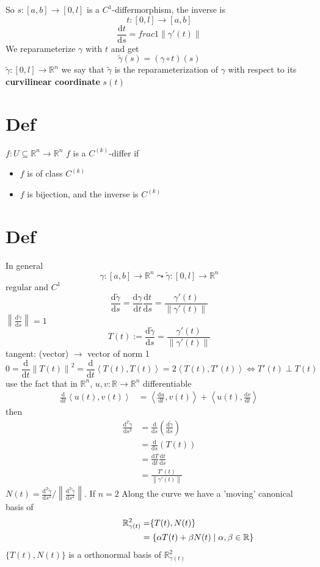 \documentclass{article}
\newcommand{\norm}[1]{\left\lVert #1 \right\rVert}
\begin{document}
So $s:[a,b]\rightarrow[0,l]$ is a $C^1$-differmorphism, the inverse is $$t:[0,l]\rightarrow[a,b]$$$$\frac{\text{d}t}{\text{d}s}=frac{1}{\norm{\gamma'(t)}}$$
We reparameterize $\gamma$ with $t$ and get
$$\tilde{\gamma}(s)=(\gamma\circ t)(s)$$
$\tilde{\gamma}:[0,l]\rightarrow\mathbb{R}^n$ we say that $\tilde{\gamma}$ is the reparameterization of $\gamma$ with respect to its \textbf{curvilinear coordinate} $s(t)$
\section{Def}
$f:U\subseteq\mathbb{R}^n\rightarrow\mathbb{R}^n$ $f$ is a $C^{(k)}$-differ if \begin{itemize}
    \item $f$ is of class $C^{(k)}$
    \item $f$ is bijection, and the inverse is $C^{(k)}$
\end{itemize}
\section{Def}
In general $$\gamma:[a,b]\rightarrow\mathbb{R}^n\leadsto \tilde{\gamma}:[0,l]\rightarrow\mathbb{R}^n$$
regular and $C^1$
$$\frac{\text{d}\tilde{\gamma}}{\text{d}s}=\frac{\text{d}\gamma}{\text{d}t}\frac{\text{d}t}{\text{d}s}=\frac{\gamma'(t)}{\norm{\gamma'(t)}}$$
$\norm{\frac{\text{d}\tilde{\gamma}}{\text{d}s}}=1$
$$T(t):=\frac{\text{d}\tilde{\gamma}}{\text{d}s}=\frac{\gamma'(t)}{\norm{\gamma'(t)}}$$
tangent: (vector) $\rightarrow$ vector of norm 1
$$0=\frac{\text{d}}{\text{d}t}\norm{T(t)}^2=\frac{\text{d}}{\text{d}t}\left<T(t),T(t)\right>=2\left<T(t),T'(t)\right>\Leftrightarrow T'(t)\perp T(t)$$
use the fact that in $\mathbb{R}^n$, $u,v:\mathbb{R}\rightarrow\mathbb{R}^n$ differentiable
$$\begin{aligned}
    \frac{\text{d}}{\text{d}t}\left<u(t),v(t)\right> &= \left<\frac{\text{d}u}{\text{d}t},v(t)\right>+\left<u(t),\frac{\text{d}v}{\text{d}t}\right>
\end{aligned}$$
then
$$
\begin{aligned}
    \frac{\text{d}^2\tilde{\gamma}}{\text{d}s^2}&=\frac{\text{d}}{\text{d}s}(\frac{\text{d}\tilde{\gamma}}{\text{d}s})\\
    &=\frac{\text{d}}{\text{d}s}(T(t))\\
    &=\frac{\text{d}T}{\text{d}t}\frac{\text{d}t}{\text{d}s}\\
    &=\frac{T'(t)}{\norm{\gamma'(t)}}    
\end{aligned}$$
$N(t)=\frac{\text{d}^2\tilde{\gamma}}{\text{d}s^2}/\norm{\frac{\text{d}^2\tilde{\gamma}}{\text{d}s^2}}$. If $n=2$
Along the curve we have a 'moving' canonical basis of 
$$\begin{aligned}
    \mathbb{R}^2_{\gamma(t)}&=\span\{T(t),N(t)\}\\
    &=\{\alpha T(t)+\beta N(t)\mid\alpha,\beta\in \mathbb{R}\}
\end{aligned}$$
$\{T(t),N(t)\}$ is a orthonormal basis of $\mathbb{R}^2_{\gamma(t)}$
\end{document}
